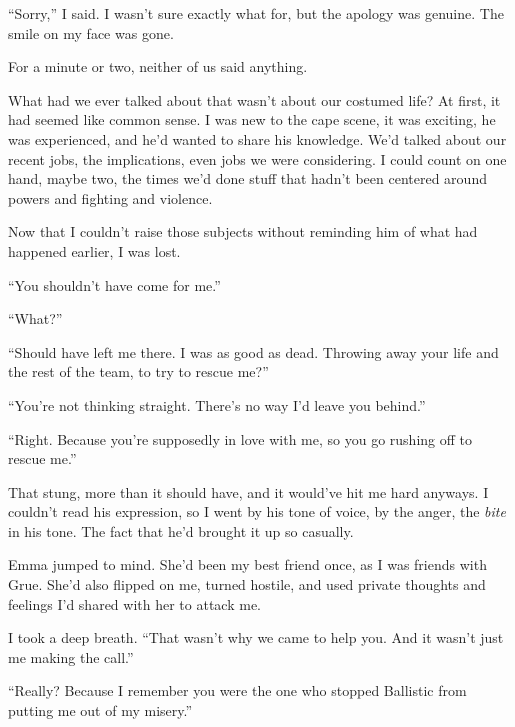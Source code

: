 ``Sorry,'' I said.  I wasn't sure exactly what for, but the apology was genuine.  The smile on my face was gone.



For a minute or two, neither of us said anything.



What had we ever talked about that wasn't about our costumed life?  At first, it had seemed like common sense.  I was new to the cape scene, it was exciting, he was experienced, and he'd wanted to share his knowledge.  We'd talked about our recent jobs, the implications, even jobs we were considering.  I could count on one hand, maybe two, the times we'd done stuff that hadn't been centered around powers and fighting and violence.



Now that I couldn't raise those subjects without reminding him of what had happened earlier, I was lost.



``You shouldn't have come for me.''



``What?''



``Should have left me there.  I was as good as dead.  Throwing away your life and the rest of the team, to try to rescue me?''



``You're not thinking straight.  There's no way I'd leave you behind.''



``Right.  Because you're supposedly in love with me, so you go rushing off to rescue me.''



That stung, more than it should have, and it would've hit me hard anyways.  I couldn't read his expression, so I went by his tone of voice, by the anger, the \emph{bite} in his tone.  The fact that he'd brought it up so casually.



Emma jumped to mind.  She'd been my best friend once, as I was friends with Grue. She'd also flipped on me, turned hostile, and used private thoughts and feelings I'd shared with her to attack me.



I took a deep breath.  ``That wasn't why we came to help you.  And it wasn't just me making the call.''



``Really?  Because I remember you were the one who stopped Ballistic from putting me out of my misery.''




